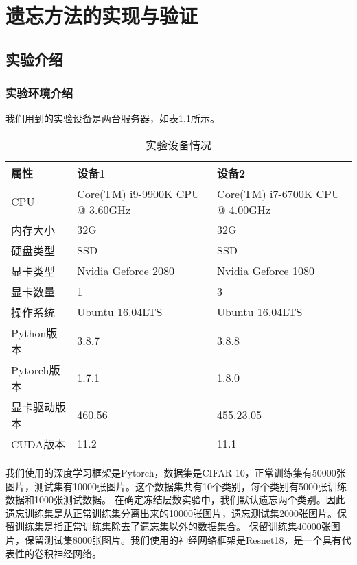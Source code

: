 
\chapter{遗忘方法的实现与验证}

\section{实验介绍}

\subsection{实验环境介绍}
我们用到的实验设备是两台服务器，如表\ref{tab:experiment-deivce}所示。
\begin{table}
    \centering
    \caption{实验设备情况}
    \begin{tabular}{lll}
      \toprule
      属性  & 设备1 & 设备2  \\
      \midrule
      CPU   & Core(TM) i9-9900K CPU @ 3.60GHz & Core(TM) i7-6700K CPU @ 4.00GHz \\
      内存大小  & 32G & 32G                    \\
      硬盘类型 & SSD  & SSD  \\
      显卡类型 & Nvidia Geforce 2080  & Nvidia Geforce 1080  \\
      显卡数量 & 1  & 3  \\
      操作系统 & Ubuntu 16.04LTS  & Ubuntu 16.04LTS  \\
      Python版本 & 3.8.7  & 3.8.8  \\
      Pytorch版本 & 1.7.1  & 1.8.0  \\
      显卡驱动版本 & 460.56  & 455.23.05  \\
      CUDA版本 & 11.2  & 11.1  \\
      \bottomrule
    \end{tabular}
    \label{tab:experiment-deivce}
\end{table}

我们使用的深度学习框架是Pytorch，数据集是CIFAR-10\cite{cifar10_2009}，正常训练集有50000张图片，测试集有10000张图片。这个数据集共有10个类别，每个类别有5000张训练数据和1000张测试数据。
在确定冻结层数实验中，我们默认遗忘两个类别。因此遗忘训练集是从正常训练集分离出来的10000张图片，遗忘测试集2000张图片。保留训练集是指正常训练集除去了遗忘集以外的数据集合。
保留训练集40000张图片，保留测试集8000张图片。我们使用的神经网络框架是Resnet18\cite{He_2016_CVPR}，是一个具有代表性的卷积神经网络。

